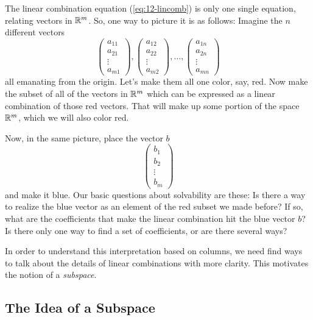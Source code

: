 \documentclass[elementsmain.tex]{subfiles}
\begin{document}
The linear combination equation (\ref{eq:12-lincomb}) is only one single equation, relating vectors in $\mathbb{R}^m$. So, one way to picture it is as follows: Imagine the $n$ different vectors 
\begin{equation*}
\begin{pmatrix} a_{11}\\ a_{21} \\ \vdots \\ a_{m1}\end{pmatrix} ,
\begin{pmatrix} a_{12}\\ a_{22} \\ \vdots \\ a_{m2}\end{pmatrix} ,
\dots ,
\begin{pmatrix} a_{1n}\\ a_{2n} \\ \vdots \\ a_{mn}\end{pmatrix}
\end{equation*}
all emanating from the origin. Let's make them all one color, say, red. Now make the subset of all of the vectors in $\mathbb{R}^m$ which can be expressed as a linear combination of those red vectors. That will make up some portion of the space $\mathbb{R}^m$, which we will also color red.

Now, in the same picture, place the vector $b$
\begin{equation*}
\begin{pmatrix} b_1\\ b_2 \\ \vdots \\ b_m\end{pmatrix}
\end{equation*}
and make it blue. Our basic questions about solvability are these: Is there a way to realize the blue vector as an element of the red subset we made before? If so, what are the coefficients that make the linear combination hit the blue vector $b$? Is there only one way to find a set of coefficients, or are there several ways?




In order to understand this interpretation based on columns, we need find ways to talk about the details of linear combinations with more clarity. This motivates the notion of a \emph{subspace}.

\subsection*{The Idea of a Subspace}
\end{document}
